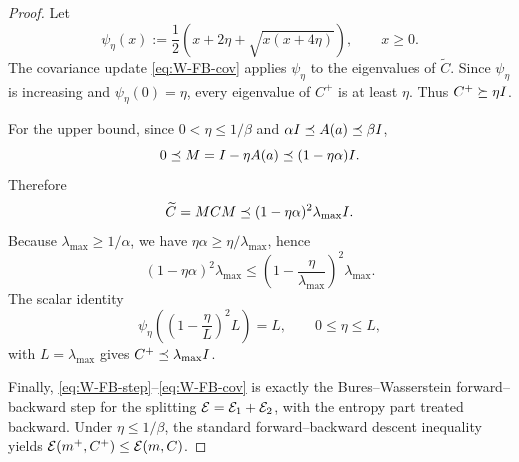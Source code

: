 \begin{proof}
Let
\[
    \psi_\eta(x)
    :=
    \frac12\left(x+2\eta+\sqrt{x(x+4\eta)}\right),
    \qquad x\ge0.
\]
The covariance update \eqref{eq:W-FB-cov} applies $\psi_\eta$ to the eigenvalues of
$\widetilde C$. Since $\psi_\eta$ is increasing and $\psi_\eta(0)=\eta$, every eigenvalue of
$C^+$ is at least $\eta$. Thus $C^+\succeq\eta I$.

For the upper bound, since $0<\eta\le1/\beta$ and $\alpha I\preceq A(a)\preceq\beta I$,
\[
    0\preceq M=I-\eta A(a)\preceq(1-\eta\alpha)I.
\]
Therefore
\[
    \widetilde C=MCM\preceq (1-\eta\alpha)^2\lambda_{\max}I.
\]
Because $\lambda_{\max}\ge1/\alpha$, we have $\eta\alpha\ge\eta/\lambda_{\max}$, hence
\[
    (1-\eta\alpha)^2\lambda_{\max}
    \le
    \left(1-\frac\eta{\lambda_{\max}}\right)^2\lambda_{\max}.
\]
The scalar identity
\[
    \psi_\eta\!\left(\left(1-\frac\eta L\right)^2L\right)=L,
    \qquad 0\le\eta\le L,
\]
with $L=\lambda_{\max}$ gives $C^+\preceq\lambda_{\max}I$.

Finally, \eqref{eq:W-FB-step}--\eqref{eq:W-FB-cov} is exactly the Bures--Wasserstein
forward--backward step for the splitting $\mathcal{E}=\mathcal{E}_1+\mathcal{E}_2$, with the entropy part treated
backward. Under $\eta\le1/\beta$, the standard forward--backward descent inequality yields
$\mathcal{E}(m^+,C^+)\le\mathcal{E}(m,C)$.
\end{proof}

